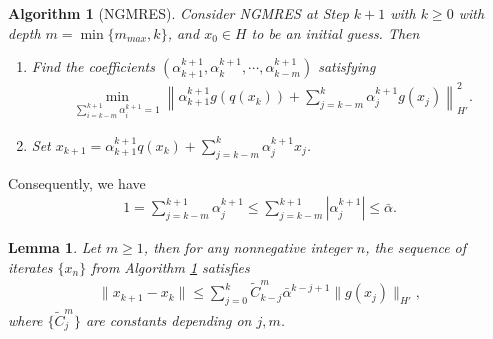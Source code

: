 \documentclass[10pt,a4paper]{amsart}
\newtheorem{alg}{Algorithm}
\newtheorem{lemma}{Lemma}
\begin{document}
\begin{alg}[NGMRES]
\label{alg:ngmres}
Consider NGMRES at Step $k+1$ with $k\geq 0$ with depth $m=\min \{ m_{max},k \}$, and $x_0\in H$ to be an initial guess. Then
\begin{enumerate}
    \item [1.] Find the coefficients $(\alpha^{k+1}_{k+1}, \alpha^{k+1}_{k}, \cdots, \alpha^{k+1}_{k-m})$ satisfying 
    \begin{align}
       \min\limits_{\sum\limits_{i=k-m}^{k+1} \alpha_i^{k+1} =1} \left\| \alpha_{k+1}^{k+1} g(q(x_k)) + \sum\limits_{j=k-m}^k \alpha^{k+1}_j g(x_j) \right\|^2_{H'}.
       \label{minstep}
    \end{align}
    \item [2.] Set $x_{k+1} =\alpha_{k+1}^{k+1} q(x_k) + \sum\limits_{j=k-m}^k \alpha^{k+1}_j x_j $.
\end{enumerate}
\end{alg}

Consequently, we have \begin{align}
1 = \sum_{j=k-m}^{k+1} \alpha_j^{k+1} \le \sum_{j=k-m}^{k+1} |\alpha_j^{k+1}| \le \bar\alpha.
\label{alphabd}
\end{align}

\begin{lemma} 
\label{lemma1}
Let $m\ge 1$, then for any nonnegative integer $n$, the sequence of iterates $\{ x_n \}$ from Algorithm \ref{alg:ngmres} satisfies
\begin{align}
 \| x_{k+1} - x_k\| \le \sum\limits_{j=0}^{k} \widetilde C_{k-j}^m \bar\alpha^{k-j+1} \|g(x_j)\|_{H'},
 \label{ineq:induc}
\end{align}
where $\{ \widetilde C_{j}^m \}$ are constants depending on $j,m$.
\end{lemma}
\end{document}
